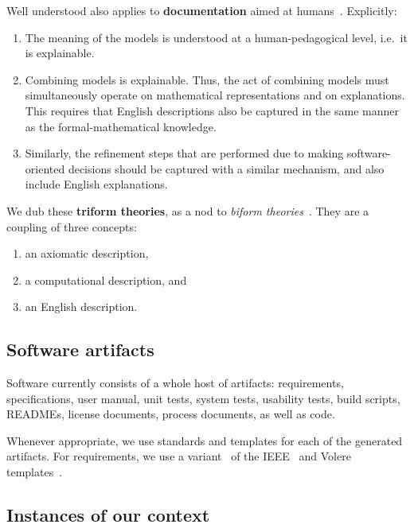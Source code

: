 \documentclass[a4paper,UKenglish,cleveref,autoref,thm-restate]{oasics-v2021}
\begin{document}
Well understood also applies to \textbf{documentation} aimed
at humans~\cite{parnas2011precise}. Explicitly:
\begin{enumerate}
\item The meaning of the models is understood at a human-pedagogical level,
i.e.\ it is explainable.
\item Combining models is explainable. Thus, the act of combining models
must simultaneously
operate on mathematical representations and on explanations. This requires that
English descriptions also be captured in the same manner as the
formal-mathematical knowledge.
\item Similarly, the refinement steps that are performed due to making
software-oriented decisions should be captured with a similar mechanism, and
also include English explanations.
\end{enumerate}

\begin{definition}
\label{defn:triform-theories}
We dub these \textbf{triform theories}, as a nod to \emph{biform
theories}~\cite{Farmer2007}. They are a coupling of three concepts:
\begin{enumerate}
  \item an axiomatic description,
  \item a computational description, and
  \item an English description.
\end{enumerate}
\end{definition}

\subsection{Software artifacts}
\label{subsec:software-artifacts}

Software currently consists of a whole host of artifacts: requirements,
specifications, user manual, unit tests, system tests, usability tests, build
scripts, READMEs, license documents, process documents, as well as code.

Whenever appropriate, we use standards and templates for each of the generated
artifacts. For requirements, we use a variant~\cite{SmithEtAl2007}
of the IEEE~\cite{IEEE1998} and Volere
templates~\cite{RobertsonAndRobertson1999Vol}.

\subsection{Instances of our context}
\label{subsec:examples-of-context}
\end{document}
